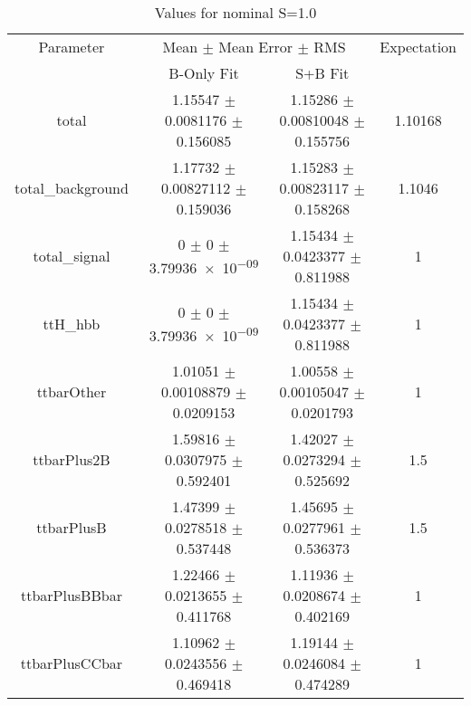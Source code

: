 \begin{table}
\centering
\caption{Values for nominal S=1.0}
\begin{tabular}{cccc}
\toprule
Parameter & \multicolumn{2}{c}{Mean $\pm$ Mean Error $\pm$ RMS} & Expectation\\
 & B-Only Fit & S+B Fit & \\
\midrule
total & \num{1.15547} $\pm$ \num{0.0081176} $\pm$ \num{0.156085} & \num{1.15286} $\pm$ \num{0.00810048} $\pm$ \num{0.155756} & \num{1.10168}\\
total\_background & \num{1.17732} $\pm$ \num{0.00827112} $\pm$ \num{0.159036} & \num{1.15283} $\pm$ \num{0.00823117} $\pm$ \num{0.158268} & \num{1.1046}\\
total\_signal & \num{0} $\pm$ \num{0} $\pm$ \num{3.79936e-09} & \num{1.15434} $\pm$ \num{0.0423377} $\pm$ \num{0.811988} & \num{1}\\
ttH\_hbb & \num{0} $\pm$ \num{0} $\pm$ \num{3.79936e-09} & \num{1.15434} $\pm$ \num{0.0423377} $\pm$ \num{0.811988} & \num{1}\\
ttbarOther & \num{1.01051} $\pm$ \num{0.00108879} $\pm$ \num{0.0209153} & \num{1.00558} $\pm$ \num{0.00105047} $\pm$ \num{0.0201793} & \num{1}\\
ttbarPlus2B & \num{1.59816} $\pm$ \num{0.0307975} $\pm$ \num{0.592401} & \num{1.42027} $\pm$ \num{0.0273294} $\pm$ \num{0.525692} & \num{1.5}\\
ttbarPlusB & \num{1.47399} $\pm$ \num{0.0278518} $\pm$ \num{0.537448} & \num{1.45695} $\pm$ \num{0.0277961} $\pm$ \num{0.536373} & \num{1.5}\\
ttbarPlusBBbar & \num{1.22466} $\pm$ \num{0.0213655} $\pm$ \num{0.411768} & \num{1.11936} $\pm$ \num{0.0208674} $\pm$ \num{0.402169} & \num{1}\\
ttbarPlusCCbar & \num{1.10962} $\pm$ \num{0.0243556} $\pm$ \num{0.469418} & \num{1.19144} $\pm$ \num{0.0246084} $\pm$ \num{0.474289} & \num{1}\\
\bottomrule
\end{tabular}
\end{table}